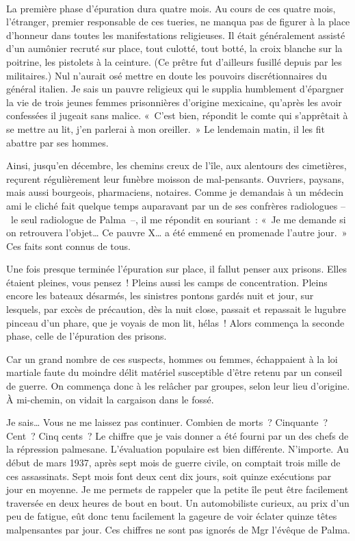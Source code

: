 \documentclass[french,twoside]{book} %
\begin{document}
\noindent  \par
La première phase d’épuration dura quatre mois. Au cours de ces quatre mois, l’étranger, premier responsable de ces tueries, ne manqua pas de figurer à la place d’honneur dans toutes les manifestations religieuses. Il était généralement assisté d’un aumônier recruté sur place, tout culotté, tout botté, la croix blanche sur la poitrine, les pistolets à la ceinture. (Ce prêtre fut d’ailleurs fusillé depuis par les militaires.) Nul n’aurait osé mettre en doute les pouvoirs discrétionnaires du général italien. Je sais un pauvre religieux qui le supplia humblement d’épargner la vie de trois jeunes femmes prisonnières d’origine mexicaine, qu’après les avoir confessées il jugeait sans malice. « C’est bien, répondit le comte qui s’apprêtait à se mettre au lit, j’en parlerai à mon oreiller. » Le lendemain matin, il les fit abattre par ses hommes.\par
Ainsi, jusqu’en décembre, les chemins creux de l’île, aux alentours des cimetières, reçurent régulièrement leur funèbre moisson de mal-pensants. Ouvriers, paysans, mais aussi bourgeois, pharmaciens, notaires. Comme je demandais à un médecin ami le cliché fait quelque temps auparavant par un de ses confrères radiologues – le seul radiologue de Palma –, il me répondit en souriant : « Je me demande si on retrouvera l’objet… Ce pauvre X… a été emmené en promenade l’autre jour. » Ces faits sont connus de tous.\par
Une fois presque terminée l’épuration sur place, il fallut penser aux prisons. Elles étaient pleines, vous pensez ! Pleins aussi les camps de concentration. Pleins encore les bateaux désarmés, les sinistres pontons gardés nuit et jour, sur lesquels, par excès de précaution, dès la nuit close, passait et repassait le lugubre pinceau d’un phare, que je voyais de mon lit, hélas ! Alors commença la seconde phase, celle de l’épuration des prisons.\par
Car un grand nombre de ces suspects, hommes ou femmes, échappaient à la loi martiale faute du moindre délit matériel susceptible d’être retenu par un conseil de guerre. On commença donc à les relâcher par groupes, selon leur lieu d’origine. À mi-chemin, on vidait la cargaison dans le fossé.\par
Je sais… Vous ne me laissez pas continuer. Combien de morts ? Cinquante ? Cent ? Cinq cents ? Le chiffre que je vais donner a été fourni par un des chefs de la répression palmesane. L’évaluation populaire est bien différente. N’importe. Au début de mars 1937, après sept mois de guerre civile, on comptait trois mille de ces assassinats. Sept mois font deux cent dix jours, soit quinze exécutions par jour en moyenne. Je me permets de rappeler que la petite île peut être facilement traversée en deux heures de bout en bout. Un automobiliste curieux, au prix d’un peu de fatigue, eût donc tenu facilement la gageure de voir éclater quinze têtes malpensantes par jour. Ces chiffres ne sont pas ignorés de Mgr l’évêque de Palma.\par
\end{document}
